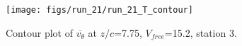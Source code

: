 \begin{figure}[H]
\centering
\texttt{[image: figs/run\_21/run\_21\_T\_contour]}
\caption{Contour plot of $\overline{v_{\theta}}$ at $z/c$=7.75, $V_{free}$=15.2, station 3.}
\label{fig:run_21_T_contour}
\end{figure}


